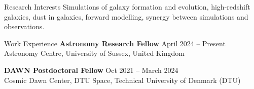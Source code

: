 \documentclass[a4paper,10pt]{resume} %
\begin{document}
  


\begin{rSection}{Research Interests}
Simulations of galaxy formation and evolution, high-redshift galaxies, dust in galaxies, forward modelling, synergy between simulations and observations.
\end{rSection} 


\begin{rSection}{Work Experience}
{\bf Astronomy Research Fellow} \hfill {April 2024 -- Present} 
\\
Astronomy Centre, University of Sussex, United Kingdom	
	
{\bf DAWN Postdoctoral Fellow} \hfill {Oct 2021 -- March 2024} 
\\
Cosmic Dawn Center, DTU Space, Technical University of Denmark (DTU)
\end{rSection} 

\end{document}
